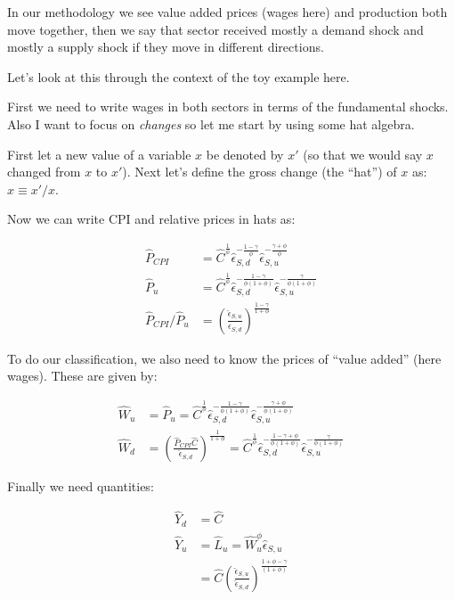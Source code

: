 \documentclass[12pt,english]{article}
\begin{document}
In our methodology we see value added prices (wages here) and production both move together, then we say that sector received mostly a demand shock and mostly a supply shock if they move in different directions. 

Let's look at this through the context of the toy example here.

First we need to write wages in both sectors in terms of the fundamental shocks. Also I want to focus on \emph{changes} so let me start by using some hat algebra.

First let a new value of a variable $x$ be denoted by $x'$ (so that we would say $x$ changed from $x$ to $x'$). Next let's define the gross change (the ``hat'') of $x$ as: $\hat{x}\equiv x'/x$.

Now we can write CPI and relative prices in hats as:

\begin{align*}
	\hat{P}_{CPI} &= \hat{C}^{\frac{1}{\phi}}\hat{\epsilon}_{S,d}^{-\frac{1-\gamma}{\phi}}\hat{\epsilon}_{S,u}^{-\frac{\gamma+\phi}{\phi}}\\
	\hat{P}_u&=\hat{C}^{\frac{1}{\phi}}\hat{\epsilon}_{S,d}^{-\frac{1-\gamma}{\phi(1+\phi)}}\hat{\epsilon}_{S,u}^{-\frac{\gamma}{\phi(1+\phi)}}\\
	\hat{P}_{CPI}/\hat{P}_u&=\left(\frac{\hat{\epsilon}_{S,u}}{\hat{\epsilon}_{S,d}}\right)^{\frac{1-\gamma}{1+\phi}}
\end{align*}

To do our classification, we also need to know the prices of ``value added'' (here wages). These are given by:

\begin{align*}
	\hat{W}_u &= \hat{P}_{u} = \hat{C}^{\frac{1}{\phi}}\hat{\epsilon}_{S,d}^{-\frac{1-\gamma}{\phi(1+\phi)}}\hat{\epsilon}_{S,u}^{-\frac{\gamma+\phi}{\phi(1+\phi)}}\\
	\hat{W}_d &=\left(\frac{\hat{P}_{CPI}\hat{C}}{\hat{\epsilon}_{S,d}}\right)^{\frac{1}{1+\phi}} = \hat{C}^{\frac{1}{\phi}} \hat{\epsilon}_{S,d}^{-\frac{1-\gamma+\phi}{\phi(1+\phi)}}\hat{\epsilon}_{S,u}^{-\frac{\gamma}{\phi(1+\phi)}}
\end{align*}

Finally we need quantities:

\begin{align*}
	\hat{Y}_d &= \hat{C}\\
	\hat{Y}_u &= \hat{L}_u = \hat{W}_u^\phi\hat{\epsilon}_{S,u}\\
	&=\hat{C} \left(\frac{\hat{\epsilon}_{S,u}}{\hat{\epsilon}_{S,d}}\right)^{\frac{1+\phi-\gamma}{(1+\phi)}}
\end{align*}
\end{document}
